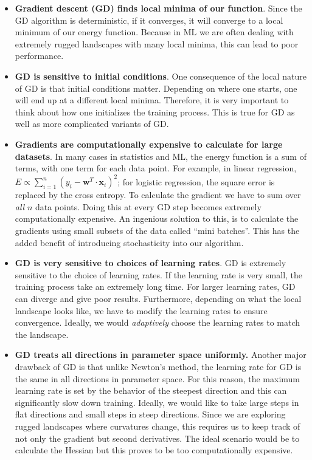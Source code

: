 \documentclass[%
oneside,                 %
final,                   %
10pt]{article}
\begin{document}
\begin{itemize}
\item \textbf{Gradient descent (GD) finds local minima of our function}. Since the GD algorithm is deterministic, if it converges, it will converge to a local minimum of our energy function. Because in ML we are often dealing with extremely rugged landscapes with many local minima, this can lead to poor performance.

\item \textbf{GD is sensitive to initial conditions}. One consequence of the local nature of GD is that initial conditions matter. Depending on where one starts, one will end up at a different local minima. Therefore, it is very important to think about how one initializes the training process. This is true for GD as well as more complicated variants of GD.

\item \textbf{Gradients are computationally expensive to calculate for large datasets}. In many cases in statistics and ML, the energy function is a sum of terms, with one term for each data point. For example, in linear regression, $E \propto \sum_{i=1}^n (y_i - \mathbf{w}^T\cdot\mathbf{x}_i)^2$; for logistic regression, the square error is replaced by the cross entropy. To calculate the gradient we have to sum over \emph{all} $n$ data points. Doing this at every GD step becomes extremely computationally expensive. An ingenious solution to this, is to calculate the gradients using small subsets of the data called ``mini batches''. This has the added benefit of introducing stochasticity into our algorithm.

\item \textbf{GD is very sensitive to choices of learning rates}. GD is extremely sensitive to the choice of learning rates. If the learning rate is very small, the training process take an extremely long time. For larger learning rates, GD can diverge and give poor results. Furthermore, depending on what the local landscape looks like, we have to modify the learning rates to ensure convergence. Ideally, we would \emph{adaptively} choose the learning rates to match the landscape.

\item \textbf{GD treats all directions in parameter space uniformly.} Another major drawback of GD is that unlike Newton's method, the learning rate for GD is the same in all directions in parameter space. For this reason, the maximum learning rate is set by the behavior of the steepest direction and this can significantly slow down training. Ideally, we would like to take large steps in flat directions and small steps in steep directions. Since we are exploring rugged landscapes where curvatures change, this requires us to keep track of not only the gradient but second derivatives. The ideal scenario would be to calculate the Hessian but this proves to be too computationally expensive. 


\end{itemize}
\end{document}
